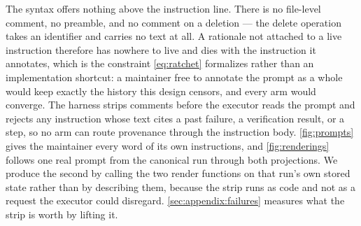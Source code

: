 The syntax offers nothing above the instruction line. There is no file-level comment, no preamble,
and no comment on a deletion --- the delete operation takes an identifier and carries no text at
all. A rationale not attached to a live instruction therefore has nowhere to live and dies with the
instruction it annotates, which is the constraint \autoref{eq:ratchet} formalizes rather than an
implementation shortcut: a maintainer free to annotate the prompt as a whole would keep exactly the
history this design censors, and every arm would converge.
The harness strips comments before the executor reads the prompt and rejects any instruction whose
text cites a past failure, a verification result, or a step, so no arm can route provenance through
the instruction body. \autoref{fig:prompts} gives the maintainer every word of its own instructions,
and \autoref{fig:renderings} follows one real prompt from the canonical run through both
projections. We produce the second by calling the two render functions on that run's own stored
state rather than by describing them, because the strip runs as code and not as a request the
executor could disregard.
\autoref{sec:appendix:failures} measures what the strip is worth by lifting it.




